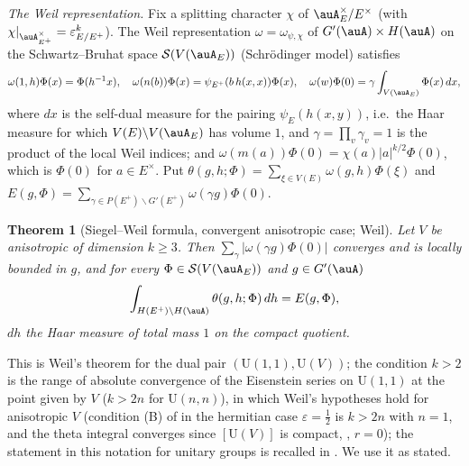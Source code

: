 \documentclass[10pt]{amsart}
\newtheorem{theorem}{Theorem}[section]
\theoremstyle{definition}
\theoremstyle{remark}
\providecommand{\auU}{\mathrm U}
\begin{document}
\emph{The Weil representation.} Fix a splitting character $\chi$ of $\auA_E^\times/E^\times$ (with
$\chi|_{\auA_{E^+}^\times}=\varepsilon_{E/E^+}^k$). The Weil representation $\omega=\omega_{\psi,\chi}$ of
$G'(\auA)\times H(\auA)$ on the Schwartz--Bruhat space $\mathcal S(V(\auA_E))$ (Schr\"odinger model) satisfies
\[
\omega(1,h)\Phi(x)=\Phi(h^{-1}x),\quad\omega(n(b))\Phi(x)=\psi_{E^+}(b\,h(x,x))\Phi(x),\quad
\omega(w)\Phi(0)=\gamma\int_{V(\auA_E)}\Phi(x)\,dx ,
\]
where $dx$ is the self-dual measure for the pairing $\psi_E(h(x,y))$, i.e.\ the Haar measure for which $V(E)\backslash
V(\auA_E)$ has volume $1$, and $\gamma=\prod_v\gamma_v=1$ is the product of the local Weil indices; and
$\omega(m(a))\Phi(0)=\chi(a)|a|^{k/2}\Phi(0)$, which is $\Phi(0)$ for $a\in E^\times$. Put $\theta(g,h;\Phi)=\sum_{\xi\in V(E)}
\omega(g,h)\Phi(\xi)$ and $E(g,\Phi)=\sum_{\gamma\in P(E^+)\backslash G'(E^+)}\omega(\gamma g)\Phi(0)$.

\begin{theorem}[Siegel--Weil formula, convergent anisotropic case; Weil]\label{pfg:weil}
Let $V$ be anisotropic of dimension $k\ge3$. Then $\sum_\gamma|\omega(\gamma g)\Phi(0)|$ converges and is locally bounded in $g$,
and for every $\Phi\in\mathcal S(V(\auA_E))$ and $g\in G'(\auA)$
\[
\int_{H(E^+)\backslash H(\auA)}\theta(g,h;\Phi)\,dh=E(g,\Phi),
\]
$dh$ the Haar measure of total mass $1$ on the compact quotient.
\end{theorem}
This is Weil's theorem \cite[Th\'eor\`eme~5]{WeilSiegel} for the dual pair $(\auU(1,1),\auU(V))$; the condition $k>2$ is
the range of absolute convergence of the Eisenstein series on $\auU(1,1)$ at the point given by $V$ ($k>2n$ for
$\auU(n,n)$), in which Weil's hypotheses hold for anisotropic $V$ (condition (B) of \cite[no.~38]{WeilSiegel} in the hermitian case
$\varepsilon=\frac12$ is $k>2n$ with $n=1$, and the theta integral converges since $[\auU(V)]$ is compact, \cite[Proposition~8]{WeilSiegel},
$r=0$); the statement in this notation for unitary groups is recalled in \cite[Introduction, p.~242]{IchinoSW}. We use
it as stated.
\end{document}
